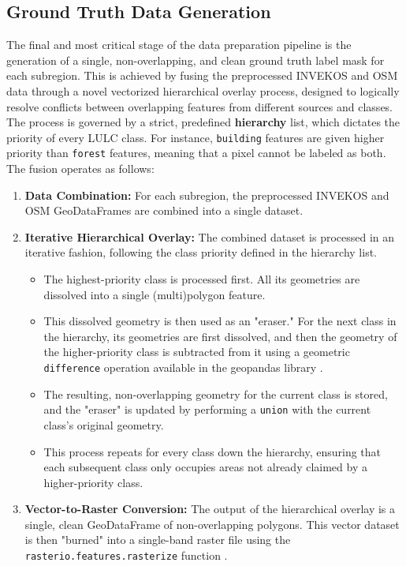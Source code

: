 \documentclass{report}
\begin{document}
\subsection{Ground Truth Data Generation}
\label{seq:ground_truth_generation}
The final and most critical stage of the data preparation pipeline is the generation of a single, non-overlapping, and clean ground truth label mask for each subregion. This is achieved by fusing the preprocessed INVEKOS and OSM data through a novel vectorized hierarchical overlay process, designed to logically resolve conflicts between overlapping features from different sources and classes.
The process is governed by a strict, predefined \textbf{hierarchy} list, which dictates the priority of every LULC class. For instance, \texttt{building} features are given higher priority than \texttt{forest} features, meaning that a pixel cannot be labeled as both. The fusion operates as follows:
\begin{enumerate}
    \item \textbf{Data Combination:} For each subregion, the preprocessed INVEKOS and OSM GeoDataFrames are combined into a single dataset.
    \item \textbf{Iterative Hierarchical Overlay:} The combined dataset is processed in an iterative fashion, following the class priority defined in the hierarchy list.
    \begin{itemize}
        \item The highest-priority class is processed first. All its geometries are dissolved into a single (multi)polygon feature.
        \item  This dissolved geometry is then used as an "eraser." For the next class in the hierarchy, its geometries are first dissolved, and then the geometry of the higher-priority class is subtracted from it using a geometric \texttt{difference} operation available in the geopandas library \parencite{JordahlEtAlgeopandasgeopandasv0812020}.
        \item  The resulting, non-overlapping geometry for the current class is stored, and the "eraser" is updated by performing a \texttt{union} with the current class's original geometry.
        \item  This process repeats for every class down the hierarchy, ensuring that each subsequent class only occupies areas not already claimed by a higher-priority class.
    \end{itemize}
    \item \textbf{Vector-to-Raster Conversion:} The output of the hierarchical overlay is a single, clean GeoDataFrame of non-overlapping polygons. This vector dataset is then "burned" into a single-band raster file using the \texttt{rasterio.features.rasterize} function \parencite{GilliesRasteriogeospatialrasterPythonprogrammers2013}. 
\end{enumerate}
\end{document}
